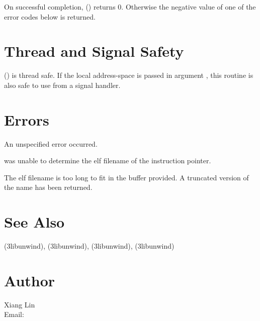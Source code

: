 \documentclass{article}
\begin{document}
On successful completion, ()
returns 0.  Otherwise the negative value of one of the error codes
below is returned.

\section{Thread and Signal Safety}

() is thread safe.  If the local
address-space is passed in argument , this routine is also
safe to use from a signal handler.

\section{Errors}

\begin{Description}
\item[\Const{UNW\_EUNSPEC}] An unspecified error occurred.
\item[\Const{UNW\_ENOINFO}]  was unable to determine
  the elf filename of the instruction pointer.
\item[\Const{UNW\_ENOMEM}] The elf filename is too long to fit
  in the buffer provided.  A truncated version of the name has been
  returned.
\end{Description}

\section{See Also}

(3libunwind),
(3libunwind),
(3libunwind),
(3libunwind)

\section{Author}

\noindent
Xiang Lin\\
Email: \\
\LatexManEnd
\end{document}
